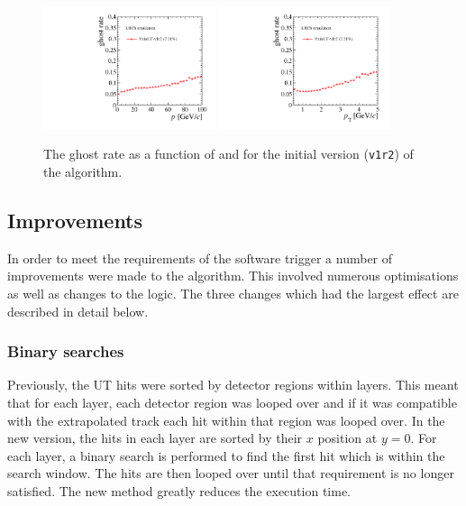 \begin{figure}[!tb]
\centering
\includegraphics[width=0.45\textwidth]{figs/upstream-tracking-upgrade/gr_p_v1r2.pdf}
\includegraphics[width=0.45\textwidth]{figs/upstream-tracking-upgrade/gr_pt_v1r2.pdf}
\caption{The ghost rate as a function of \ptot and \pt for the initial version (\texttt{v1r2}) of the \velout algorithm.}
\label{fig:gr_velout_v1r2}
\end{figure}

\subsection{Improvements}

In order to meet the requirements of the software trigger a number of improvements were made to the \velout algorithm. This involved numerous \cpp optimisations as well as changes to the logic. The three changes which had the largest effect are described in detail below.

\subsubsection{Binary searches}

Previously, the UT hits were sorted by detector regions within layers. This meant that for each layer, each detector region was looped over and if it was compatible with the extrapolated \velo track each hit within that region was looped over. In the new version, the hits in each layer are sorted by their $x$ position at $y = 0$. For each layer, a binary search is performed to find the first hit which is within the search window. The hits are then looped over until that requirement is no longer satisfied. The new method greatly reduces the execution time.

